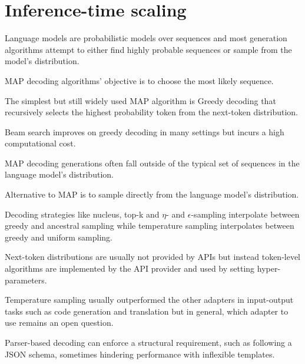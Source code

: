 \section{Inference-time scaling}


Language models are probabilistic models over sequences and most generation algorithms attempt to either find highly probable sequences or sample from the model’s distribution. \cite{welleck2024decodingmetagenerationinferencetimealgorithms}

MAP decoding algorithms' objective is to choose the most likely sequence. \cite{welleck2024decodingmetagenerationinferencetimealgorithms}

The simplest but still widely used MAP algorithm is Greedy decoding that recursively selects the highest probability token from the next-token distribution. \cite{welleck2024decodingmetagenerationinferencetimealgorithms}

Beam search improves on greedy decoding in many settings but incurs a high computational cost. \cite{welleck2024decodingmetagenerationinferencetimealgorithms}

MAP decoding generations often fall outside of the typical set of sequences in the language model’s distribution. \cite{welleck2024decodingmetagenerationinferencetimealgorithms}

Alternative to MAP is to sample directly from the language model's distribution. \cite{welleck2024decodingmetagenerationinferencetimealgorithms}

Decoding strategies like nucleus, top-k and $\eta$- and $\epsilon$-sampling interpolate between greedy and ancestral sampling while temperature sampling interpolates between greedy and uniform sampling. \cite{welleck2024decodingmetagenerationinferencetimealgorithms}

Next-token distributions are usually not provided by APIs but instead token-level algorithms are implemented by the API provider and used by setting hyper-parameters. \cite{welleck2024decodingmetagenerationinferencetimealgorithms}

Temperature sampling usually outperformed the other adapters in input-output tasks such as code generation and translation but in general, which adapter to use remains an open question. \cite{welleck2024decodingmetagenerationinferencetimealgorithms}

Parser-based decoding can enforce a structural requirement, such as following a JSON schema, sometimes hindering performance with inflexible templates.  \cite{welleck2024decodingmetagenerationinferencetimealgorithms}

